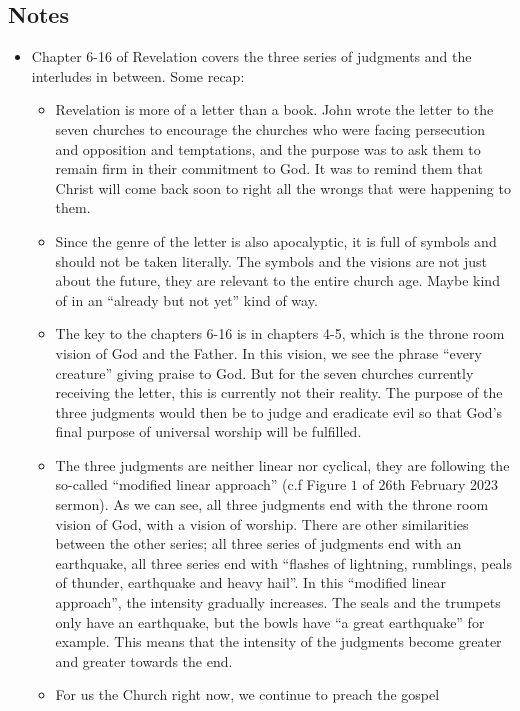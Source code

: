 \subsection*{Notes}
\begin{itemize}
  \item{Chapter 6-16 of Revelation covers the three series of judgments and the interludes in between. Some recap:
  \begin{itemize}
    \item{Revelation is more of a letter than a book.  John wrote the letter
    to the seven churches to encourage the churches who were facing
    persecution and opposition and temptations, and the purpose was to ask
    them to remain firm in their commitment to God.  It was to remind them
    that Christ will come back soon to right all the wrongs that were
    happening to them.}
    \item{Since the genre of the letter is also apocalyptic, it is full of
    symbols and should not be taken literally.  The symbols and the visions
    are not just about the future, they are relevant to the entire church
    age. Maybe kind of in an ``already but not yet'' kind of way.}
    \item{The key to the chapters 6-16 is in chapters 4-5, which is the
    throne room vision of God and the Father.  In this vision, we see the
    phrase ``every creature'' giving praise to God.  But for the seven
    churches currently receiving the letter, this is currently not their
    reality.  The purpose of the three judgments would then be to judge and
    eradicate evil so that God's final purpose of universal worship will be
    fulfilled.}
    \item{The three judgments are neither linear nor cyclical, they are
    following the so-called ``modified linear approach'' (c.f Figure $1$ of
    26th February 2023 sermon).  As we can see, all three judgments end with
    the throne room vision of God, with a vision of worship.  There are other
    similarities between the other series; all three series of judgments end
    with an earthquake, all three series end with ``flashes of lightning,
    rumblings, peals of thunder, earthquake and heavy hail''.  In this
    ``modified linear approach'', the intensity gradually increases.  The
    seals and the trumpets only have an earthquake, but the bowls have ``a
    great earthquake'' for example.  This means that the intensity of the
    judgments become greater and greater towards the end.}
    \item{For us the Church right now, we continue to preach the gospel
}
\end{itemize}}
\end{itemize}

